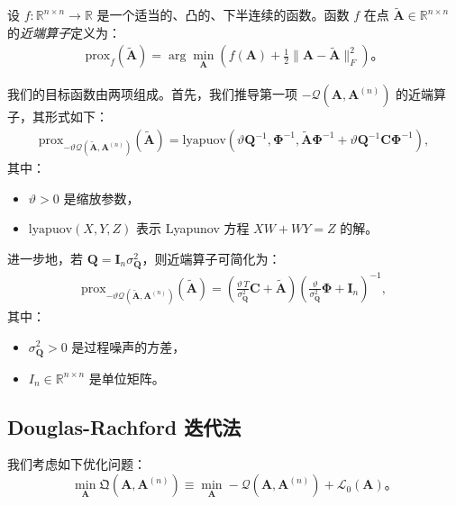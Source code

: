 设 \( f: \mathbb{R}^{n \times n} \to \mathbb{R} \) 是一个适当的、凸的、下半连续的函数。函数 \( f \) 在点 \(\tilde{\mathbf{A}} \in \mathbb{R}^{n \times n}\) 的\textit{近端算子}定义为：
\begin{align*}
    \text{prox}_{f}(\tilde{\mathbf{A}}) = \arg\min_{\mathbf{A}} \left( f(\mathbf{A}) + \frac{1}{2} \| \mathbf{A} - \tilde{\mathbf{A}} \|^2_F \right)。
\end{align*}

我们的目标函数由两项组成。首先，我们推导第一项 \(-\mathcal{Q}(\mathbf{A}, \mathbf{A}^{(n)})\) 的近端算子，其形式如下：
\begin{align*}
    \mathrm{prox}_{-\vartheta\mathcal{Q}(\tilde{\mathbf{A}}, \mathbf{A}^{(n)})} (\tilde{\mathbf{A}}) = \mathrm{lyapuov} \left( \vartheta \mathbf{Q}^{-1}, \boldsymbol{\Phi}^{-1}, \tilde{\mathbf{A}} \boldsymbol{\Phi}^{-1} + \vartheta \mathbf{Q}^{-1} \mathbf{C} \boldsymbol{\Phi}^{-1} \right),
\end{align*}
其中：
\begin{itemize}
    \item \(\vartheta > 0\) 是缩放参数，
    \item \(\mathrm{lyapuov}(X, Y, Z)\) 表示 Lyapunov 方程 \(XW + WY = Z\) 的解。
\end{itemize}

进一步地，若 \(\mathbf{Q} = \mathbf{I}_{n} \sigma^2_{\mathbf{Q}}\)，则近端算子可简化为：
\begin{align*}
    \mathrm{prox}_{-\vartheta\mathcal{Q}(\tilde{\mathbf{A}}, \mathbf{A}^{(n)})} (\tilde{\mathbf{A}}) = \left( \frac{\vartheta\, T}{\sigma^2_{\mathbf{Q}}} \mathbf{C} + \tilde{\mathbf{A}} \right) \left( \frac{\vartheta}{\sigma^2_{\mathbf{Q}}} \boldsymbol{\Phi} + \mathbf{I}_{n} \right)^{-1},
\end{align*}
其中：
\begin{itemize}
    \item \(\sigma^2_{\mathbf{Q}} > 0\) 是过程噪声的方差，
    \item \(I_{n} \in \mathbb{R}^{n \times n}\) 是单位矩阵。
\end{itemize}

\subsection{Douglas-Rachford 迭代法}

我们考虑如下优化问题：
\begin{equation}
    \min_{\mathbf{A}} \mathfrak{Q}(\mathbf{A}, \mathbf{A}^{(n)}) \equiv \min_{\mathbf{A}} -\mathcal{Q}(\mathbf{A}, \mathbf{A}^{(n)}) + \mathcal{L}_0(\mathbf{A})。
\end{equation}

